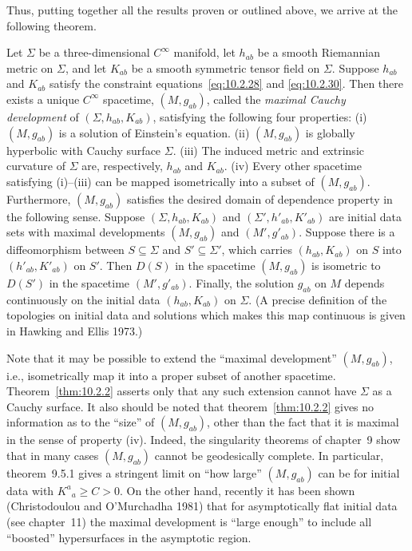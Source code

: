 Thus, putting together all the results proven or outlined above, we arrive at the
following theorem.

\begin{theorem}\label{thm:10.2.2}
Let \(\Sigma\) be a three-dimensional \(C^\infty\) manifold, let \(h_{ab}\) be a
smooth Riemannian metric on \(\Sigma\), and let \(K_{ab}\) be a smooth symmetric
tensor field on \(\Sigma\). Suppose \(h_{ab}\) and \(K_{ab}\) satisfy the constraint
equations~\eqref{eq:10.2.28} and \eqref{eq:10.2.30}. Then there exists a unique
\(C^\infty\) spacetime, \((M,g_{ab})\), called the \emph{maximal Cauchy development}
of \((\Sigma,h_{ab},K_{ab})\), satisfying the following four properties: (i)
\((M,g_{ab})\) is a solution of Einstein's equation. (ii) \((M,g_{ab})\) is globally
hyperbolic with Cauchy surface \(\Sigma\). (iii) The induced metric and extrinsic
curvature of \(\Sigma\) are, respectively, \(h_{ab}\) and \(K_{ab}\). (iv) Every other
spacetime satisfying (i)--(iii) can be mapped isometrically into a subset of
\((M,g_{ab})\). Furthermore, \((M,g_{ab})\) satisfies the desired domain of dependence
property in the following sense. Suppose \((\Sigma,h_{ab},K_{ab})\) and
\((\Sigma',h'_{ab},K'_{ab})\) are initial data sets with maximal developments
\((M,g_{ab})\) and \((M',g'_{ab})\). Suppose there is a diffeomorphism between
\(S\subseteq\Sigma\) and \(S'\subseteq\Sigma'\), which carries \((h_{ab},K_{ab})\)
on \(S\) into \((h'_{ab},K'_{ab})\) on \(S'\). Then \(D(S)\) in the spacetime
\((M,g_{ab})\) is isometric to \(D(S')\) in the spacetime \((M',g'_{ab})\). Finally,
the solution \(g_{ab}\) on \(M\) depends continuously on the initial data
\((h_{ab},K_{ab})\) on \(\Sigma\). (A precise definition of the topologies on initial
data and solutions which makes this map continuous is given in Hawking and Ellis
1973.)
\end{theorem}

Note that it may be possible to extend the ``maximal development'' \((M,g_{ab})\),
i.e., isometrically map it into a proper subset of another spacetime.
Theorem~\ref{thm:10.2.2} asserts only that any such extension cannot have \(\Sigma\)
as a Cauchy surface. It also should be noted that theorem~\ref{thm:10.2.2} gives no
information as to the ``size'' of \((M,g_{ab})\), other than the fact that it is maximal
in the sense of property (iv). Indeed, the singularity theorems of chapter~9 show that
in many cases \((M,g_{ab})\) cannot be geodesically complete. In particular,
theorem~9.5.1 gives a stringent limit on ``how large'' \((M,g_{ab})\) can be for initial
data with \(K^a{}_a\geq C>0\). On the other hand, recently it has been shown
(Christodoulou and O'Murchadha 1981) that for asymptotically flat initial data (see
chapter~11) the maximal development is ``large enough'' to include all ``boosted''
hypersurfaces in the asymptotic region.

